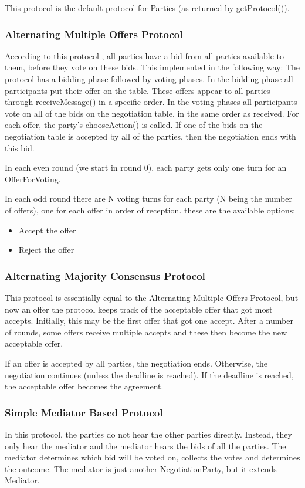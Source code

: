 \documentclass[]{llncs}
\begin{document}
This protocol is the default protocol for Parties (as returned by getProtocol()).


\subsubsection{Alternating Multiple Offers Protocol}
According to this protocol \cite{MultilateralOffersProtocols}, all parties have a bid from all parties available to them, before they vote on these bids. This implemented in the following way: The protocol has a bidding phase followed by voting phases. In the bidding phase all participants put their offer on the table. These offers appear to all parties through receiveMessage() in a specific order. In the voting phases all participants vote on all of the bids on the negotiation table, in the same order as received. For each offer, the party's chooseAction() is called. If one of the bids on the negotiation table is accepted by all of the parties, then the negotiation ends with this bid. 

In each even round (we start in round 0), each party gets only one turn for an OfferForVoting. 

In each odd round there are N voting turns for each party (N being the number of offers), one for each offer in order of reception. these are the available options:
\begin{itemize}
\item Accept the offer
\item Reject the offer
\end{itemize}


\subsubsection{Alternating Majority Consensus Protocol}

This protocol is essentially equal to the Alternating Multiple Offers Protocol, but now an offer the protocol keeps track of the acceptable offer that got most accepts.
Initially, this may be the first offer that got one accept. After a number of rounds, some offers receive multiple accepts and these then become the new acceptable offer.

If an offer is accepted by all parties, the negotiation ends. Otherwise, the negotiation continues (unless the deadline is reached). If the deadline is reached, the acceptable offer becomes the agreement.
 
 
\subsubsection{Simple Mediator Based Protocol}
In this protocol, the parties do not hear the other parties directly. Instead, they only hear the mediator and the mediator hears the bids of all the parties. The mediator determines which bid will be voted on, collects the votes and determines the outcome. The mediator is just another NegotiationParty, but it extends Mediator.
\end{document}
